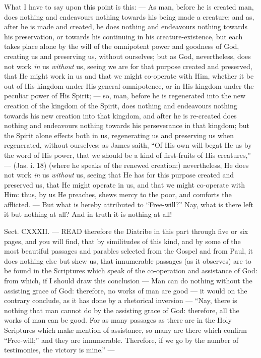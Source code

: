 What I have to say upon this point is this: — As man, before he is created man, does nothing and endeavours nothing towards his being made a creature; and as, after he is made and created, he does nothing and endeavours nothing towards his preservation, or towards his continuing in his creature-existence, but each takes place alone by the will of the omnipotent power and goodness of God, creating us and preserving us, without ourselves; but as God, nevertheless, does not work \emph{in }us \emph{without }us, seeing we are for that purpose created and preserved, that He might work in us and that we might co-operate with Him, whether it be out of His kingdom under His general omnipotence, or in His kingdom under the peculiar power of His Spirit; — so, man, before he is regenerated into the new creation of the kingdom of the Spirit, does nothing and endeavours nothing towards his new creation into that kingdom, and after he is re-created does nothing and endeavours nothing towards his perseverance in that kingdom; but the Spirit alone effects both in us, regenerating us and preserving us when regenerated, without ourselves; as James saith, “Of His own will begat He us by the word of His power, that we should be a kind of first-fruits of His creatures,” — (Jas. i. 18) (where he speaks of the renewed creation:) nevertheless, He does not work \emph{in }us \emph{without }us, seeing that He has for this purpose created and preserved us, that He might operate in us, and that we might co-operate with Him: thus, by us He preaches, shews mercy to the poor, and comforts the afflicted. — But what is hereby attributed to “Free-will?” Nay, what is there left it but nothing at all? And in truth it is nothing at all!


Sect. CXXXII. — READ therefore the Diatribe in this part through five or six pages, and you will find, that by similitudes of this kind, and by some of the most beautiful passages and parables selected from the Gospel and from Paul, it does nothing else but shew us, that innumerable passages (as it observes) are to be found in the Scriptures which speak of the co-operation and assistance of God: from which, if I should draw this conclusion — Man can do nothing without the assisting grace of God: therefore, no works of man are good — it would on the contrary conclude, as it has done by a rhetorical inversion — “Nay, there is nothing that man cannot do by the assisting grace of God: therefore, all the works of man can be good. For as many passages as there are in the Holy Scriptures which make mention of assistance, so many are there which confirm “Free-will;” and they are innumerable. Therefore, if we go by the number of testimonies, the victory is mine.” —

